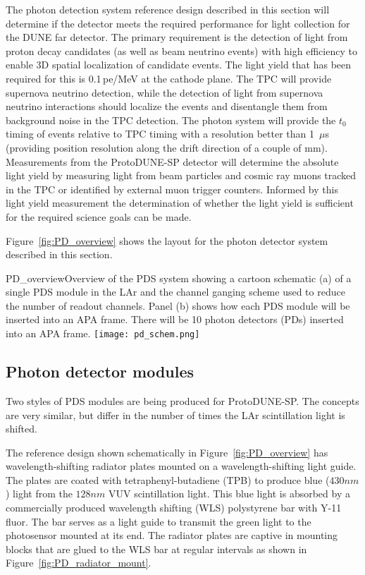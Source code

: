 The photon detection system reference design described in this section
will determine if the detector meets the required performance for 
light collection for the DUNE far detector. 
The primary requirement is the detection of light from proton decay
candidates (as well as beam neutrino events) with high efficiency to
enable 3D spatial localization of candidate events. The light yield that
has been required for this is 0.1\,pe/MeV at the cathode plane.
The TPC will provide supernova neutrino detection, while the detection of light
from supernova neutrino interactions should localize the events and disentangle
them from background noise in the TPC detection.
The photon system will provide the $t_0$ timing of
events relative to TPC timing with a resolution better than 1~$\mu$s
(providing position resolution along the drift direction of a couple of mm). 
Measurements from the ProtoDUNE-SP detector will determine the absolute
light yield by measuring light from beam particles and cosmic ray muons
tracked in the TPC or identified by external muon trigger counters.
Informed by this light yield measurement the determination of whether the 
light yield is sufficient for the required science goals can be made.

Figure~\ref{fig:PD_overview} shows the layout for the photon detector
system described in this section. %

\begin{cdrfigure}{PD_overview}{Overview of the PDS
    system showing a cartoon schematic (a) of a single PDS module
    in the LAr and the channel ganging scheme used to reduce the
    number of readout channels. Panel (b) shows how each PDS module
    will be inserted into an APA frame. There will be 10 photon detectors (PDs) inserted
    into an APA frame.}
\texttt{[image: pd\_schem.png]}
\end{cdrfigure}

\subsection{Photon detector modules}

Two styles of PDS %
modules are being produced for ProtoDUNE-SP.  
The concepts are very similar, but differ in the number of times the LAr scintillation 
light is shifted.  

The reference design shown schematically in Figure~\ref{fig:PD_overview}
has wavelength-shifting radiator plates mounted on a wavelength-shifting light guide.
The plates are coated 
with tetraphenyl-butadiene (TPB) to produce blue ($430nm$) light from the $128nm$ VUV 
scintillation light.  
This blue light is absorbed by a commercially produced wavelength shifting (WLS)
polystyrene bar with Y-11 fluor.  
The bar serves as a light guide to transmit the green light to the photosensor 
mounted at its end.
The radiator plates are captive in mounting blocks that are glued to the WLS bar
at regular intervals as shown in Figure~\ref{fig:PD_radiator_mount}.

